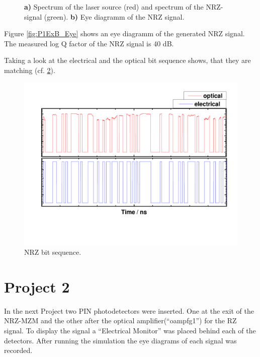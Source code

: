 \begin{figure}
\caption{\textbf{a)} Spectrum of the laser source (red) and spectrum of the NRZ-signal (green). \textbf{b)} Eye diagramm of the NRZ signal.}%
\label{fig:P1ExB_1}%
\end{figure}

Figure \ref{fig:P1ExB_Eye} shows an eye diagramm of the generated NRZ signal. 
 The measured log Q factor of the NRZ signal is 40 dB.

Taking a look at the electrical and the optical bit sequence shows, that they are matching (cf. \ref{fig:P1ExB_bit}).

\begin{figure}%
\includegraphics[width=\columnwidth]{Grafiken/P1ExB_BitSequence.pdf}%
\caption{NRZ bit sequence.}%
\label{fig:P1ExB_bit}%
\end{figure}

\section{Project 2}
In the next Project two PIN photodetectors were inserted. One at the exit of the NRZ-MZM and the other after the optical amplifier("`oampfg1"') for the RZ signal. To display the signal a "`Electrical Monitor"' was placed behind each of the detectors. After running the simulation the eye diagrams of each signal was recorded.
